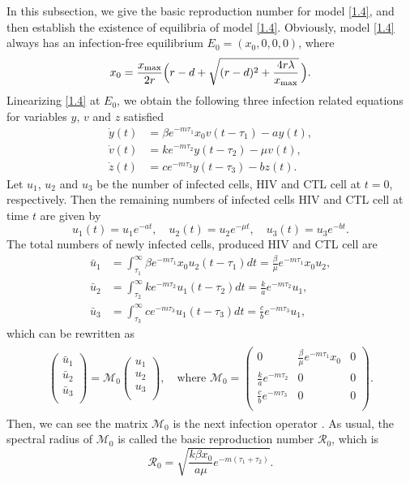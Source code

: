 \documentclass[reqno]{amsart}
\begin{document}
In this subsection, we  give the basic reproduction number for model \eqref{1.4}, 
and then establish the existence of equilibria of model \eqref{1.4}.  
Obviously,   model \eqref{1.4} always has an infection-free equilibrium
 $E_0=(x_0,0,0,0)$, where
\begin{equation} \label{2.4}
 x_0=\frac{x_{\rm max}}{2r} \Big(r-d+\sqrt{(r-d)^{2}
 +\frac{4r\lambda}{x_{\rm max}}}\, \Big).
\end{equation}
Linearizing \eqref{1.4} at $E_0$, we obtain the following three infection related
equations for variables $y$, $v$ and $z$ satisfied
 \begin{align*}
\dot{y}(t)&= \beta e^{-m\tau_1}x_0v(t-\tau_1)-ay(t),\\
\dot{v}(t)&= k e^{-m\tau_2}y(t-\tau_2)-\mu v(t),\\
\dot{z}(t)&= ce^{-m\tau_3}y(t-\tau_3)-bz(t).
\end{align*}
Let $u_1$, $u_2$ and $u_3$ be the number of infected cells, HIV and CTL cell at $t=0$,
respectively. Then the remaining numbers of infected cells
 HIV and CTL  cell at time $t$ are given by
$$
u_1(t)=u_1e^{-at},\quad u_2(t)=u_2e^{-\mu t}, \quad u_3(t)=u_3e^{-bt}.
$$
The total numbers of newly infected cells, produced HIV and CTL  cell are
\begin{align*}
\bar{u}_1&=  \int_{\tau_{1}}^{\infty}\beta e^{-m\tau_1}x_0u_2(t-\tau_1)dt=\frac{\beta }{\mu}e^{-m\tau_1}x_0u_2,\\
\bar{u}_2&=  \int_{\tau_{2}}^{\infty}k e^{-m\tau_2} u_1(t-\tau_2)dt=\frac{k}{a}e^{-m\tau_2}u_1,\\
\bar{u}_3&= \int_{\tau_{3}}^{\infty}ce^{-m\tau_3} u_1(t-\tau_3)dt=\frac{c}{b}e^{-m\tau_3}u_1,
\end{align*}
which can be rewritten as
\begin{align*}
\begin{array}{ll}
\begin{pmatrix} \bar{u}_1\\
\bar{u}_2\\
\bar{u}_3\\
\end{pmatrix}=\mathcal{M}_0
\begin{pmatrix}
 {u}_1\\
 {u}_2\\
 {u}_3\\
 \end{pmatrix},
 \quad \text{where } 
 \mathcal{M}_0=\begin{pmatrix}
 0&\frac{\beta }{\mu} e^{-m \tau_1}x_0&0\\
 \frac{k}{a} e^{-m\tau_2}&0&0\\
 \frac{c}{b}e^{-m\tau_3}&0&0\\
 \end{pmatrix}.
 \end{array}
 \end{align*}
Then, we can see the matrix $\mathcal{M}_0$ is the next infection operator \cite{DW}.
 As usual, the spectral radius of $\mathcal{M}_0$ is called the basic reproduction
number $\mathcal{R}_0$,  which is
\[
 \mathcal{R}_0=\sqrt{{\frac{k\beta x_0}{a\mu}e^{-m(\tau_1+\tau_2)}}}.
\]
\end{document}
